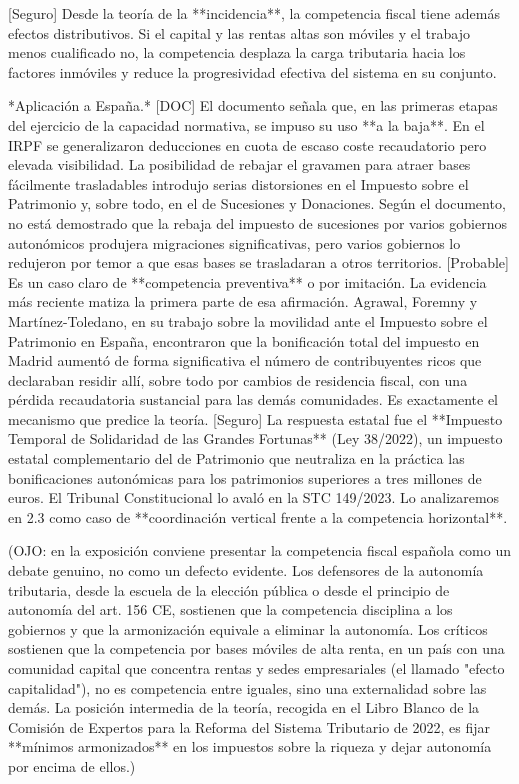 \documentclass[10pt,a4paper]{article}
\begin{document}
[Seguro] Desde la teoría de la **incidencia**, la competencia fiscal tiene además efectos distributivos. Si el capital y las rentas altas son móviles y el trabajo menos cualificado no, la competencia desplaza la carga tributaria hacia los factores inmóviles y reduce la progresividad efectiva del sistema en su conjunto.

*Aplicación a España.* [DOC] El documento señala que, en las primeras etapas del ejercicio de la capacidad normativa, se impuso su uso **a la baja**. En el IRPF se generalizaron deducciones en cuota de escaso coste recaudatorio pero elevada visibilidad. La posibilidad de rebajar el gravamen para atraer bases fácilmente trasladables introdujo serias distorsiones en el Impuesto sobre el Patrimonio y, sobre todo, en el de Sucesiones y Donaciones. Según el documento, no está demostrado que la rebaja del impuesto de sucesiones por varios gobiernos autonómicos produjera migraciones significativas, pero varios gobiernos lo redujeron por temor a que esas bases se trasladaran a otros territorios. [Probable] Es un caso claro de **competencia preventiva** o por imitación. La evidencia más reciente matiza la primera parte de esa afirmación. Agrawal, Foremny y Martínez-Toledano, en su trabajo sobre la movilidad ante el Impuesto sobre el Patrimonio en España, encontraron que la bonificación total del impuesto en Madrid aumentó de forma significativa el número de contribuyentes ricos que declaraban residir allí, sobre todo por cambios de residencia fiscal, con una pérdida recaudatoria sustancial para las demás comunidades. Es exactamente el mecanismo que predice la teoría. [Seguro] La respuesta estatal fue el **Impuesto Temporal de Solidaridad de las Grandes Fortunas** (Ley 38/2022), un impuesto estatal complementario del de Patrimonio que neutraliza en la práctica las bonificaciones autonómicas para los patrimonios superiores a tres millones de euros. El Tribunal Constitucional lo avaló en la STC 149/2023. Lo analizaremos en 2.3 como caso de **coordinación vertical frente a la competencia horizontal**.

(OJO: en la exposición conviene presentar la competencia fiscal española como un debate genuino, no como un defecto evidente. Los defensores de la autonomía tributaria, desde la escuela de la elección pública o desde el principio de autonomía del art. 156 CE, sostienen que la competencia disciplina a los gobiernos y que la armonización equivale a eliminar la autonomía. Los críticos sostienen que la competencia por bases móviles de alta renta, en un país con una comunidad capital que concentra rentas y sedes empresariales (el llamado "efecto capitalidad"), no es competencia entre iguales, sino una externalidad sobre las demás. La posición intermedia de la teoría, recogida en el Libro Blanco de la Comisión de Expertos para la Reforma del Sistema Tributario de 2022, es fijar **mínimos armonizados** en los impuestos sobre la riqueza y dejar autonomía por encima de ellos.)
\end{document}
